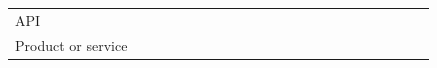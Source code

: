 \documentclass[english, 12pt, a4paper, sci, utf8, a-1b, online]{aaltothesis}
\begin{document}
\begin{center}
\begin{longtable}{p{0.3\linewidth}p{0.6\linewidth}}
    API                               & \textcite{nebeling2013informing} \newline \textcite{api-designers} \newline \textcite{pinter2019polymorph} \newline \textcite{dong2019impact} \newline \textcite{myers2016improving} \newline \textcite{macvean2016api} \newline \textcite{programmer-experience} \newline \textcite{ollis2019helping}                                                                                                                                                                                                                                                                                                                                                                                                                                                                                                                                          \\
    Product or service                & \textcite{api-designers} \newline \textcite{pinter2019polymorph} \newline \textcite{miranda2018improving} \newline \textcite{fontao2016mseco} \newline \textcite{myers2016improving} \newline \textcite{macvean2016api} \newline \textcite{kuusinen2016software}  \newline \textcite{claussen2019role}                                                                                                                                                                                                                                                                                                                                                                                                                                                                                                                                          \\

\end{longtable}
\end{center}
\end{document}
